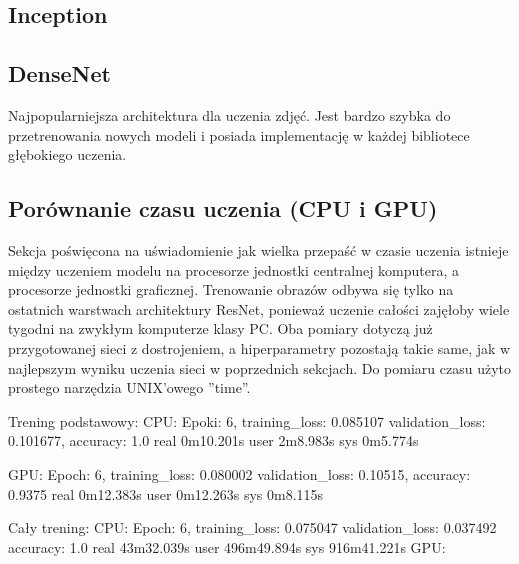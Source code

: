 \documentclass[12pt,a4paper,twoside,titlepage,openright]{book}
\begin{document}
\subsection{Inception}

\subsection{DenseNet}

Najpopularniejsza architektura dla uczenia zdjęć. Jest bardzo szybka do przetrenowania nowych modeli i posiada implementację w każdej bibliotece głębokiego uczenia.

\subsection{Porównanie czasu uczenia (CPU i GPU)}
Sekcja poświęcona na uświadomienie jak wielka przepaść w czasie uczenia istnieje między uczeniem modelu na procesorze jednostki centralnej komputera, a procesorze jednostki graficznej. Trenowanie obrazów odbywa się tylko na ostatnich warstwach architektury ResNet, ponieważ uczenie całości zajęłoby wiele tygodni na zwykłym komputerze klasy PC.
Oba pomiary dotyczą już przygotowanej sieci z dostrojeniem, a hiperparametry pozostają takie same, jak w najlepszym wyniku uczenia sieci w poprzednich sekcjach. Do pomiaru czasu użyto prostego narzędzia UNIX'owego ''time''.

Trening podstawowy:
CPU: 
Epoki: 6, training_loss: 0.085107 validation_loss: 0.101677, accuracy: 1.0
real	0m10.201s
user	2m8.983s
sys	0m5.774s

GPU:
Epoch: 6, training_loss: 0.080002 validation_loss: 0.10515, accuracy: 0.9375
real	0m12.383s
user	0m12.263s
sys	0m8.115s

Cały trening:
CPU:
Epoch: 6, training_loss: 0.075047 validation_loss: 0.037492 accuracy: 1.0
real	43m32.039s
user	496m49.894s
sys	916m41.221s
GPU:
\end{document}
